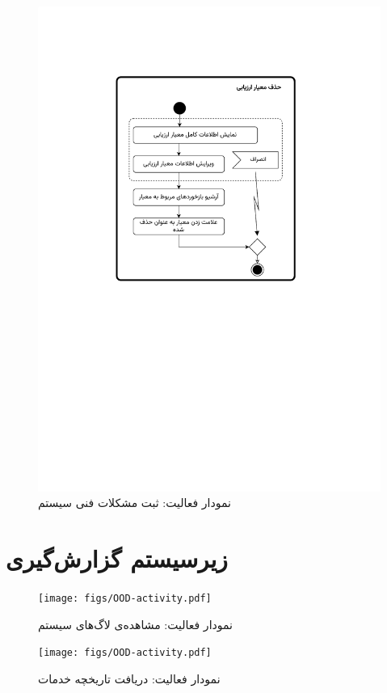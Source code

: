 \begin{figure}
	\centering
	\includegraphics[scale=0.8, page=2]{figs/OOD-activity31-35.pdf}
	\caption{نمودار فعالیت: ثبت مشکلات فنی سیستم}
\end{figure}
\FloatBarrier
\newpage


\section{زیرسیستم گزارش‌گیری}

\begin{figure}
	\centering
	\texttt{[image: figs/OOD-activity.pdf]}
	\caption{نمودار فعالیت: مشاهده‌ی لاگ‌های سیستم}
\end{figure}
\FloatBarrier
\newpage

\begin{figure}
	\centering
	\texttt{[image: figs/OOD-activity.pdf]}
	\caption{نمودار فعالیت: دریافت تاریخچه خدمات}
\end{figure}
\FloatBarrier
\newpage


